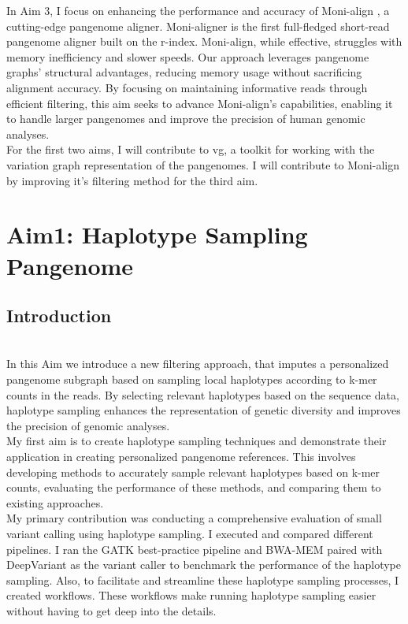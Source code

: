 \documentclass[11pt]{ucthesis}
\begin{document}
In Aim 3, I focus on enhancing the performance and accuracy of Moni-align \cite{rossi2022moni}, a cutting-edge pangenome aligner. Moni-aligner is the first full-fledged short-read pangenome aligner built on the r-index. Moni-align, while effective, struggles with memory inefficiency and slower speeds. Our approach leverages pangenome graphs' structural advantages, reducing memory usage without sacrificing alignment accuracy. By focusing on maintaining informative reads through efficient filtering, this aim seeks to advance Moni-align's capabilities, enabling it to handle larger pangenomes and improve the precision of human genomic analyses.\\
For the first two aims, I will contribute to vg, a toolkit for working with the variation graph representation of the pangenomes. I will contribute to Moni-align by improving it's filtering method for the third aim. 

\chapter{Aim1: Haplotype Sampling Pangenome}

\section{Introduction}


\\
In this Aim we introduce a new filtering approach, that imputes a personalized pangenome subgraph based on sampling local haplotypes according to k-mer counts in the reads. By selecting relevant haplotypes based on the sequence data, haplotype sampling enhances the representation of genetic diversity and improves the precision of genomic analyses. \\
My first aim is to create haplotype sampling techniques and demonstrate their application in creating personalized pangenome references. This involves developing methods to accurately sample relevant haplotypes based on k-mer counts, evaluating the performance of these methods, and comparing them to existing approaches. \\
My primary contribution was conducting a comprehensive evaluation of small variant calling using haplotype sampling. I executed and compared different pipelines. I ran the GATK best-practice pipeline and BWA-MEM paired with DeepVariant as the variant caller to benchmark the performance of the haplotype sampling. Also, to facilitate and streamline these haplotype sampling processes, I created workflows. These workflows make running haplotype sampling easier without having to get deep into the details. 
\end{document}
